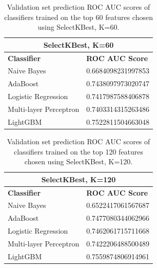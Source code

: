 \documentclass[12pt, letterpaper]{article}
\begin{document}
\begin{table}[h!]
  \centering
  {
  \begin{tabular}{|| l | l ||}
   \hline
   \multicolumn{2}{|c|}{SelectKBest, K=60} \\
   \hline
   \rowcolor{white} \textbf{Classifier} & \textbf{ROC AUC Score} \\ [0.5ex]
   \hline\hline
   Naive Bayes & 0.6684098231997853 \\
   \hline
   AdaBoost & 0.7438097973020747 \\
   \hline
   Logistic Regression & 0.7417987588406878 \\
   \hline
   Multi-layer Perceptron & 0.7403314315263486 \\
   \hline
   LightGBM & 0.7522811504663048 \\ [1ex]
   \hline
  \end{tabular}
 }
 \caption{Validation set prediction ROC AUC scores of classifiers trained on the top 60 features chosen using SelectKBest, K=60.}
 \label{table:5}
\end{table}

\begin{table}[h!]
  \centering
  {
  \begin{tabular}{|| l | l ||}
   \hline
   \multicolumn{2}{|c|}{SelectKBest, K=120} \\
   \hline
   \rowcolor{white} \textbf{Classifier} & \textbf{ROC AUC Score} \\ [0.5ex]
   \hline\hline
   Naive Bayes & 0.6522417061567687 \\
   \hline
   AdaBoost & 0.7477080344062966 \\
   \hline
   Logistic Regression & 0.7462061715711668 \\
   \hline
   Multi-layer Perceptron & 0.7422206488500489 \\
   \hline
   LightGBM & 0.7559874806914961 \\ [1ex]
   \hline
  \end{tabular}
 }
 \caption{Validation set prediction ROC AUC scores of classifiers trained on the top 120 features chosen using SelectKBest, K=120.}
 \label{table:6}
\end{table}
\end{document}
